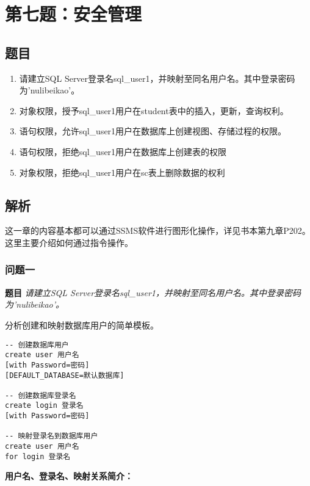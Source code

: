 \section{第七题：安全管理}

\subsection{题目}

\begin{enumerate}
  \item 请建立SQL Server登录名sql\_user1，并映射至同名用户名。其中登录密码为'nulibeikao'。
  \item 对象权限，授予sql\_user1用户在student表中的插入，更新，查询权利。
  \item 语句权限，允许sql\_user1用户在数据库上创建视图、存储过程的权限。
  \item 语句权限，拒绝sql\_user1用户在数据库上创建表的权限
  \item 对象权限，拒绝sql\_user1用户在sc表上删除数据的权利
\end{enumerate}

\subsection{解析}

\qquad 这一章的内容基本都可以通过SSMS软件进行图形化操作，详见书本第九章P202。
这里主要介绍如何通过指令操作。

\subsubsection{问题一}

\textbf{题目} \emph{请建立SQL Server登录名sql\_user1，并映射至同名用户名。其中登录密码为'nulibeikao'。}

\qquad 分析创建和映射数据库用户的简单模板。

\begin{mdframed}[backgroundcolor=gray!10]
\begin{verbatim}
-- 创建数据库用户
create user 用户名
[with Password=密码]
[DEFAULT_DATABASE=默认数据库]

-- 创建数据库登录名
create login 登录名
[with Password=密码]

-- 映射登录名到数据库用户
create user 用户名
for login 登录名
\end{verbatim}
\end{mdframed}

\qquad \textbf{用户名、登录名、映射关系简介：}

